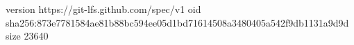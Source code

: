 version https://git-lfs.github.com/spec/v1
oid sha256:873e7781584ae81b88bc594ee05d1bd71614508a3480405a542f9db1131a9d9d
size 23640
